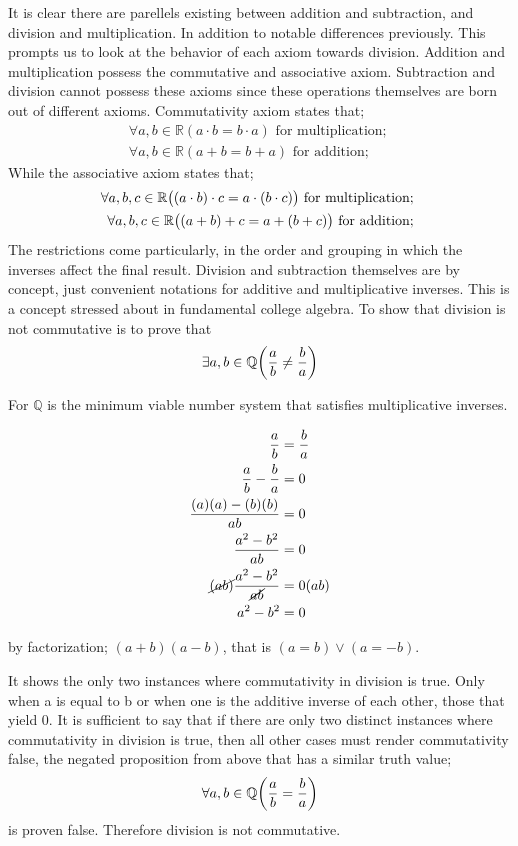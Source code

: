 \documentclass{article}
\newcommand{\paren}[1]{\mathopen{}\left( {#1}_{{}_{}}\,\negthickspace\right)\mathclose{}} %
\begin{document}
It is clear there are parellels existing between addition and subtraction, and division and multiplication. 
In addition to notable differences previously. This prompts us to look at the behavior of each 
axiom towards division. Addition and multiplication possess the commutative and associative axiom. Subtraction 
and division cannot possess these axioms since these operations themselves are born out of different axioms. 
Commutativity axiom states that;
\begin{align*}
    \forall a, b \in \mathbb{R} (a\cdot b = b \cdot a) \text{ for multiplication; } \\
    \forall a, b \in \mathbb{R} (a + b = b + a) \text{ for addition; } 
\end{align*} 
While the associative axiom states that;
\begin{align*}
    \forall a, b, c \in \mathbb{R} \paren{(a\cdot b) \cdot c = a \cdot (b \cdot c)} \text{ for multiplication; } \\
    \forall a, b, c \in \mathbb{R} \paren{(a + b) + c = a + (b + c)} \text{ for addition; } 
\end{align*} 
The restrictions come particularly, in the order and grouping in which the inverses affect the final result. 
Division and subtraction themselves are by concept, just convenient notations for additive and multiplicative inverses. This is a concept
stressed about in fundamental college algebra. To show that division is not commutative is to prove that
\[
    \exists a,b \in \mathbb {Q}\paren{\frac{a}{b}\neq\frac{b}{a}}
\]
\begin{center}
    For \(\mathbb{Q}\) is the minimum viable number system that satisfies multiplicative inverses.
\end{center}
\begin{align*}
    \frac{a}{b} &= \frac{b}{a} \\
    \frac{a}{b} - \frac{b}{a} &= 0\\
    \frac{(a)(a) - (b)(b)}{ab} &= 0 \\
    \frac{a^2- b^2}{ab} &= 0 \\
    \cancel{(ab)}\frac{a^2- b^2}{\cancel{ab}} &= 0 (ab)\\
    a^2-b^2 &= 0
\end{align*}
\begin{center}
    by factorization; \((a+b)(a-b)\), that is \((a = b) \lor (a = -b)\). 
\end{center}

It shows the only two instances where commutativity in division is true. Only when a is equal to b
or when one is the additive inverse of each other, those that yield 0. It is sufficient to say that 
if there are only two distinct instances where commutativity in division is true, then all other cases
must render commutativity false, the negated proposition from above that has a similar truth value;
\[
    \forall a,b \in \mathbb{Q}\paren{\frac{a}{b} = \frac{b}{a}} 
\]
is proven false. Therefore division is not commutative. 
\end{document}
